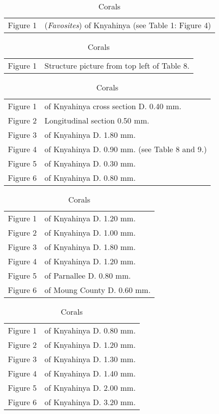 \documentclass[a4paper, 12pt, oneside]{article}
\begin{document}
\begin{table}[ht!]
\caption{Corals}
\centering
\begin{tabular}{ p{2cm} p{10cm} }
\hline
 Figure 1 & (\emph{Favosites}) of Knyahinya (see Table 1: Figure 4)
\end{tabular}
\label{table:8}
\end{table}
\begin{table}[ht!]
\caption{Corals}
\centering
\begin{tabular}{ p{2cm} p{10cm} }
\hline
 Figure 1 & Structure picture from top left of Table 8.
\end{tabular}
\label{table:9}
\end{table}
\begin{table}[ht!]
\caption{Corals}
\centering
\begin{tabular}{ p{2cm} p{10cm} }
\hline
 Figure 1 & of Knyahinya cross section D. 0.40 mm. \\
 Figure 2 & Longitudinal section 0.50 mm. \\
 Figure 3 & of Knyahinya D. 1.80 mm. \\
 Figure 4 & of Knyahinya D. 0.90 mm. (see Table 8 and 9.) \\
 Figure 5 & of Knyahinya D. 0.30 mm. \\
 Figure 6 & of Knyahinya D. 0.80 mm.
\end{tabular}
\label{table:10}
\end{table}
\begin{table}[ht!]
\caption{Corals}
\centering
\begin{tabular}{ p{2cm} p{10cm} }
\hline
 Figure 1 & of Knyahinya D. 1.20 mm. \\
 Figure 2 & of Knyahinya D. 1.00 mm. \\
 Figure 3 & of Knyahinya D. 1.80 mm. \\
 Figure 4 & of Knyahinya D. 1.20 mm. \\
 Figure 5 & of Parnallee D. 0.80 mm. \\
 Figure 6 & of Moung County D. 0.60 mm.
\end{tabular}
\label{table:11}
\end{table}
\begin{table}[ht!]
\caption{Corals}
\centering
\begin{tabular}{ p{2cm} p{10cm} }
\hline
 Figure 1 & of Knyahinya D. 0.80 mm. \\
 Figure 2 & of Knyahinya D. 1.20 mm. \\
 Figure 3 & of Knyahinya D. 1.30 mm. \\
 Figure 4 & of Knyahinya D. 1.40 mm. \\
 Figure 5 & of Knyahinya D. 2.00 mm. \\
 Figure 6 & of Knyahinya D. 3.20 mm.
\end{tabular}
\label{table:12}
\end{table}
\end{document}
